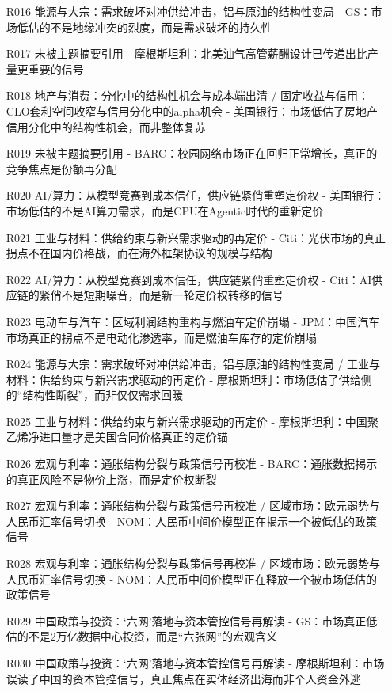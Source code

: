 \documentclass[11pt]{ctexart}
\begin{document}
\begin{itemize}
  \item [R016] 能源与大宗：需求破坏对冲供给冲击，铝与原油的结构性变局 - GS：市场低估的不是地缘冲突的烈度，而是需求破坏的持久性
  \item [R017] 未被主题摘要引用 - 摩根斯坦利：北美油气高管薪酬设计已传递出比产量更重要的信号
  \item [R018] 地产与消费：分化中的结构性机会与成本端出清 / 固定收益与信用：CLO套利空间收窄与信用分化中的alpha机会 - 美国银行：市场低估了房地产信用分化中的结构性机会，而非整体复苏
  \item [R019] 未被主题摘要引用 - BARC：校园网络市场正在回归正常增长，真正的竞争焦点是份额再分配
  \item [R020] AI/算力：从模型竞赛到成本信任，供应链紧俏重塑定价权 - 美国银行：市场低估的不是AI算力需求，而是CPU在Agentic时代的重新定价
  \item [R021] 工业与材料：供给约束与新兴需求驱动的再定价 - Citi：光伏市场的真正拐点不在国内价格战，而在海外框架协议的规模与结构
  \item [R022] AI/算力：从模型竞赛到成本信任，供应链紧俏重塑定价权 - Citi：AI供应链的紧俏不是短期噪音，而是新一轮定价权转移的信号
  \item [R023] 电动车与汽车：区域利润结构重构与燃油车定价崩塌 - JPM：中国汽车市场真正的拐点不是电动化渗透率，而是燃油车库存的定价崩塌
  \item [R024] 能源与大宗：需求破坏对冲供给冲击，铝与原油的结构性变局 / 工业与材料：供给约束与新兴需求驱动的再定价 - 摩根斯坦利：市场低估了供给侧的“结构性断裂”，而非仅仅需求回暖
  \item [R025] 工业与材料：供给约束与新兴需求驱动的再定价 - 摩根斯坦利：中国聚乙烯净进口量才是美国合同价格真正的定价锚
  \item [R026] 宏观与利率：通胀结构分裂与政策信号再校准 - BARC：通胀数据揭示的真正风险不是物价上涨，而是定价权断裂
  \item [R027] 宏观与利率：通胀结构分裂与政策信号再校准 / 区域市场：欧元弱势与人民币汇率信号切换 - NOM：人民币中间价模型正在揭示一个被低估的政策信号
  \item [R028] 宏观与利率：通胀结构分裂与政策信号再校准 / 区域市场：欧元弱势与人民币汇率信号切换 - NOM：人民币中间价模型正在释放一个被市场低估的政策信号
  \item [R029] 中国政策与投资：‘六网’落地与资本管控信号再解读 - GS：市场真正低估的不是2万亿数据中心投资，而是“六张网”的宏观含义
  \item [R030] 中国政策与投资：‘六网’落地与资本管控信号再解读 - 摩根斯坦利：市场误读了中国的资本管控信号，真正焦点在实体经济出海而非个人资金外逃

\end{itemize}
\end{document}
